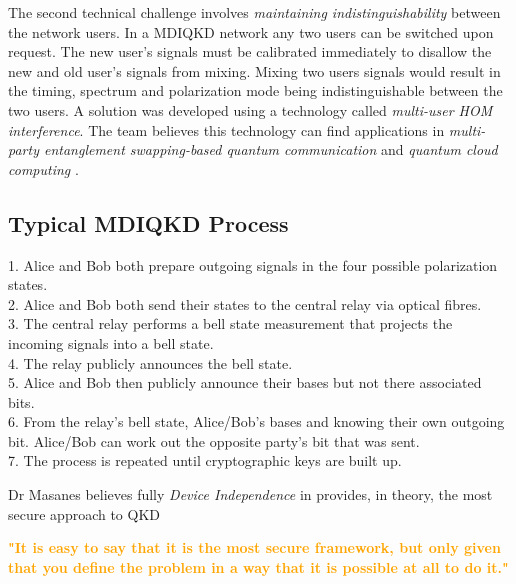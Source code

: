 \documentclass[journal]{vgtc}
\begin{document}
The second technical challenge involves \textit{maintaining indistinguishability} between the network users. In a MDIQKD network any two users can be switched upon request. The new user's signals must be calibrated immediately to disallow the new and old user's signals from mixing. Mixing two users signals would result in the timing, spectrum and polarization mode being indistinguishable between the two users. A solution was developed using a technology called \textit{multi-user HOM interference}. The team believes this technology can find applications in \textit{multi-party entanglement swapping-based quantum communication} and \textit{quantum cloud computing }.


\begin{tcolorbox}
\section*{Typical MDIQKD Process}

1. Alice and Bob both prepare outgoing signals in the four possible polarization states.\\
2. Alice and Bob both send their states to the central relay via optical fibres.\\
3. The central relay performs a bell state measurement that projects the incoming signals into a bell state.\\
4. The relay publicly announces the bell state.\\
5. Alice and Bob then publicly announce their bases but not there associated bits.\\
6. From the relay's bell state, Alice/Bob's bases and knowing their own outgoing bit. Alice/Bob can work out the opposite party's bit that was sent.\\
7. The process is repeated until cryptographic keys are built up.

\end{tcolorbox}


 
Dr Masanes believes fully \textit{Device Independence} in provides, in theory, the most secure approach to QKD 

\vspace{0.3cm}

\textcolor{orange}{\textbf{"It is easy to say  that it is the most secure framework, but only given that you define the problem in a way that it is possible at all to do it."}}

\vspace{0.3cm}
\end{document}
